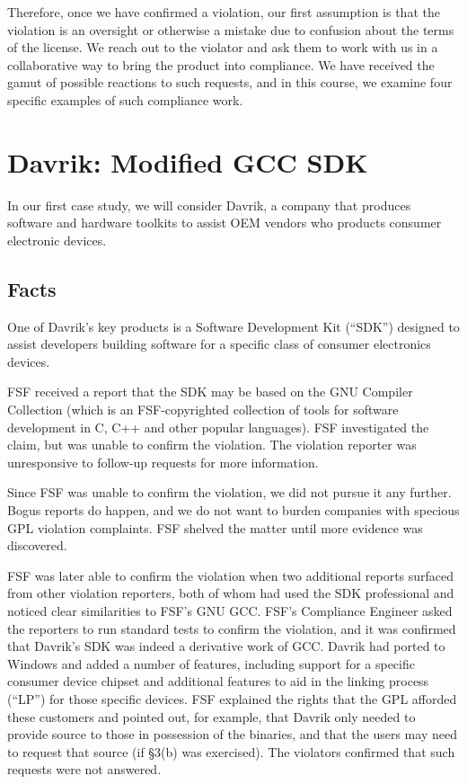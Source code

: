 \documentclass[12pt]{report}
\begin{document}
Therefore, once we have confirmed a violation, our first assumption is
that the violation is an oversight or otherwise a mistake due to confusion
about the terms of the license.  We reach out to the violator and ask them
to work with us in a collaborative way to bring the product into
compliance.  We have received the gamut of possible reactions to such
requests, and in this course, we examine four specific examples of such
compliance work.


\chapter{Davrik: Modified GCC SDK}

In our first case study, we will consider Davrik, a company that produces
software and hardware toolkits to assist OEM vendors who products consumer
electronic devices.

\section{Facts}

One of Davrik's key products is a Software Development Kit (``SDK'')
designed to assist developers building software for a specific class of
consumer electronics devices.

FSF received a report that the SDK may be based on the GNU Compiler
Collection (which is an FSF-copyrighted collection of tools for software
development in C, C++ and other popular languages).  FSF investigated the
claim, but was unable to confirm the violation.  The violation reporter
was unresponsive to follow-up requests for more information.

Since FSF was unable to confirm the violation, we did not pursue it any
further.  Bogus reports do happen, and we do not want to burden companies
with specious GPL violation complaints.  FSF shelved the matter until
more evidence was discovered.

FSF was later able to confirm the violation when two additional reports
surfaced from other violation reporters, both of whom had used the SDK
professional and noticed clear similarities to FSF's GNU GCC\@.  FSF's
Compliance Engineer asked the reporters to run standard tests to confirm
the violation, and it was confirmed that Davrik's SDK was indeed a
derivative work of GCC\@.  Davrik had ported to Windows and added a number
of features, including support for a specific consumer device chipset and
additional features to aid in the linking process (``LP'') for those
specific devices.  FSF explained the rights that the GPL afforded these
customers and pointed out, for example, that Davrik only needed to provide
source to those in possession of the binaries, and that the users may need
to request that source (if \S 3(b) was exercised).  The violators
confirmed that such requests were not answered.
\end{document}
